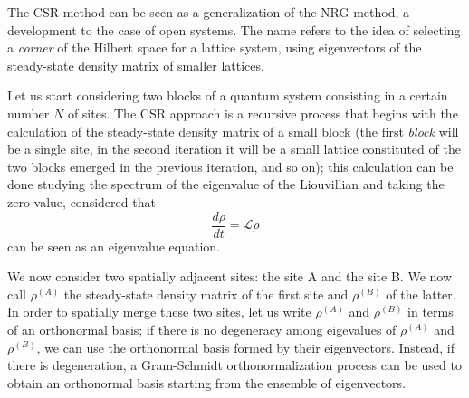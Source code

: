 The CSR method can be seen as a generalization of the NRG method, a development to the case of open systems. The name refers to the idea of selecting a \emph{corner} of the Hilbert space for a lattice system, using eigenvectors of the steady-state density matrix of smaller lattices.

Let us start considering two blocks of a quantum system consisting in a certain number $N$ of sites. The CSR approach is a recursive process that begins with the calculation of the steady-state density matrix of a small block (the first \emph{block} will be a single site, in the second iteration it will be a small lattice constituted of the two blocks emerged in the previous iteration, and so on); this calculation can be done studying the spectrum of the eigenvalue of the Liouvillian and taking the zero value, considered that
\begin{equation}
    \frac{d\rho}{dt} = \mathcal{L} \rho
\end{equation}
can be seen as an eigenvalue equation.

We now consider two spatially adjacent sites: the site A and the site B. We now call $\rho^{(A)}$ the steady-state density matrix of the first site and $\rho^{(B)}$ of the latter. In order to spatially merge these two sites, let us write $\rho^{(A)}$ and $\rho^{(B)}$ in terms of an orthonormal basis; if there is no degeneracy among eigevalues of $\rho^{(A)}$ and $\rho^{(B)}$, we can use the orthonormal basis formed by their eigenvectors. Instead, if there is degeneration, a Gram-Schmidt orthonormalization process can be used to obtain an orthonormal basis starting from the ensemble of eigenvectors.

